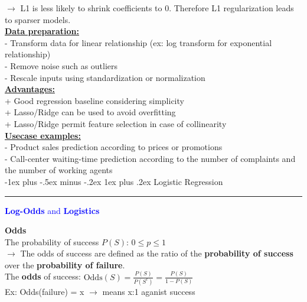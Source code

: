 \documentclass[letterpaper, 10.5pt,landscape]{article}
\makeatletter
\renewcommand{\subsubsection}{\@startsection{subsubsection}{3}{0mm}%
                                {-1ex plus -.5ex minus -.2ex}%
                                {1ex plus .2ex}%
                                {\normalfont\small\bfseries}}
\makeatother
\begin{document}
\begin{multicols*}{3}
$\rightarrow$ L1 is less likely to shrink coefficients to 0. Therefore L1 regularization leads to sparser models. \\

\vspace{5pt}
\textbf{\underline{Data preparation:}} \\
- Transform data for linear relationship (ex: log transform for exponential relationship) \\
- Remove noise such as outliers \\
- Rescale inputs using standardization or normalization \\

\vspace{3pt}
\textbf{\underline{Advantages:}} \\
+ Good regression baseline considering simplicity \\
+ Lasso/Ridge can be used to avoid overfitting \\
+ Lasso/Ridge permit feature selection in case of collinearity \\

\vspace{3pt}
\textbf{\underline{Usecase examples:}} \\
- Product sales prediction according to prices or promotions \\
- Call-center waiting-time prediction according to the number of complaints and the number of working agents \\





\subsubsection{Logistic Regression} {\color{teal}\hrule height 0.5pt} \smallskip



\textcolor{blue}{\textbf{Log-Odds} and \textbf{Logistics}} 

\vspace{2pt}
\textbf{Odds} \\
The probability of success $P(S)$:  \( 0 \leq p \leq 1\)\\
$\rightarrow$ The odds of success are defined as the ratio of the \textbf{probability of success} over the \textbf{probability of failure}. \\
The \textbf{odds} of success: \( \text{Odds}(S) = \frac{P(S)}{P(S^{c})} = \frac{P(S)}{1-P(S)} \) \\
Ex: Odds(failure) = x $\rightarrow$ means x:1 aganist success \\


\end{multicols*}
\end{document}
